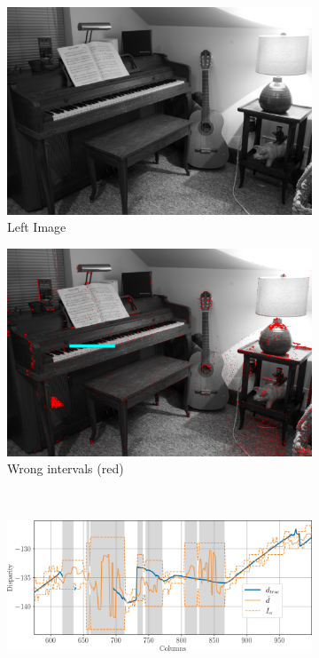 \begin{figure}
    \centering
    \begin{subfigure}[t]{0.5\linewidth}
        \centering
        \includegraphics[width=\linewidth]{Images/Chap_5/Piano-perfect_2014.png}
        \caption{Left Image}
        \label{fig:piano_a}
    \end{subfigure}\hfill
    \begin{subfigure}[t]{0.5\linewidth}
        \centering
        \includegraphics[width=\linewidth]{Images/Chap_5/Piano-perfect_2014_error.png}
        \caption{Wrong intervals (red)}
        \label{fig:piano_b}
    \end{subfigure}\\
    \begin{subfigure}[t]{1\linewidth}
        \centering
        \includegraphics[width=\linewidth]{Images/Chap_5/Piano-perfect_2014_row_900.png}

\end{subfigure}
\end{figure}

